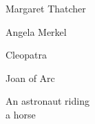 \begin{figure*}[h]
\vspace{1ex}
\begin{minipage}[t]{.025\textwidth}
     \vspace{0pt}
\end{minipage}%
\hspace{1ex}%
\begin{minipage}[t]{0.98\figwidth}
    \vspace{2mm}
    \begin{minipage}[t]{0.2\textwidth}
        \centering
        Margaret Thatcher
    \end{minipage}%
    \begin{minipage}[t]{0.2\textwidth}
        \centering
        Angela Merkel
    \end{minipage}%
    \begin{minipage}[t]{0.2\textwidth}
        \centering
        Cleopatra
    \end{minipage}%
    \begin{minipage}[t]{0.2\textwidth}
        \centering
        Joan of Arc
    \end{minipage}%
    \begin{minipage}[t]{0.2\textwidth}
        \centering
        An astronaut riding\\a horse
    \end{minipage}%
\end{minipage}


\end{figure*}
